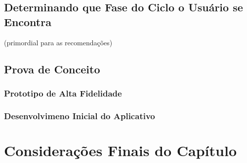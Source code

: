 \subsection{Determinando que Fase do Ciclo o Usuário se Encontra}
(primordial para as recomendações)

\subsection{Prova de Conceito}

\subsubsection{Prototipo de Alta Fidelidade}


\subsubsection{Desenvolvimeno Inicial do Aplicativo}


\section{Considerações Finais do Capítulo}
